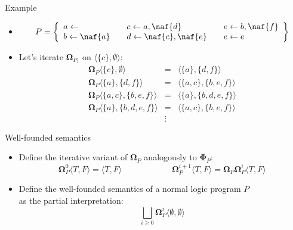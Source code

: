 \begin{frame}{Example}
  \begin{itemize}
  \item<1-> []
    \[
    P
    =
    \left\{
      \begin{array}{lll}
        a \leftarrow                  \quad &
        c \leftarrow a, \naf{d}       \quad &
        e \leftarrow b, \naf{f}
        \\
        b \leftarrow \naf{a}          \quad &
        d \leftarrow \naf{c}, \naf{e} \quad &
        e \leftarrow e
      \end{array}
    \right\}
    \]
    \medskip
  \item<2-> Let's iterate ${\mathbf{\Omega}}_{P_1}$ on $\langle \{c\}, \emptyset\rangle$:
    \[
    \begin{array}{rcl}
      {\mathbf{\Omega}}_{P}\langle\{c\}  ,\emptyset\rangle &=&\langle\{a\}  ,\{d,f\}     \rangle
      \\
      {\mathbf{\Omega}}_{P}\langle\{a\}  ,\{d,f\}    \rangle &=&\langle\{a,c\},\{b,e,f\}   \rangle
      \\
      {\mathbf{\Omega}}_{P}\langle\{a,c\},\{b,e,f\}  \rangle &=&\langle\{a\}  ,\{b,d,e,f\} \rangle
      \\
      {\mathbf{\Omega}}_{P}\langle\{a\}  ,\{b,d,e,f\}\rangle &=&\langle\{a,c\},\{b,e,f\}   \rangle
      \\
      & \vdots &
    \end{array}
    \]
  \end{itemize}
\end{frame}
\begin{frame}{Well-founded semantics}
  \bigskip
  \begin{itemize}
  \item<1-> Define the iterative variant of ${\mathbf{\Omega}}_P$ analogously to $\mathbf{\Phi}_P$:
    \[
    {\mathbf{\Omega}}_P^0\langle T, F \rangle = \langle T, F \rangle
    \qquad\qquad\qquad
    {\mathbf{\Omega}}_P^{i+1}\langle T, F \rangle =
    {\mathbf{\Omega}}_P{\mathbf{\Omega}}_P^i\langle T, F \rangle
    \]
  \item<2-> Define the \alert{well-founded semantics} of a normal logic program $P$\\
    as the partial interpretation:
    \[
    \textstyle{\bigsqcup_{i \geq 0}} {\mathbf{\Omega}}_P^i \langle \emptyset, \emptyset \rangle
    \]
  \end{itemize}
\end{frame}
